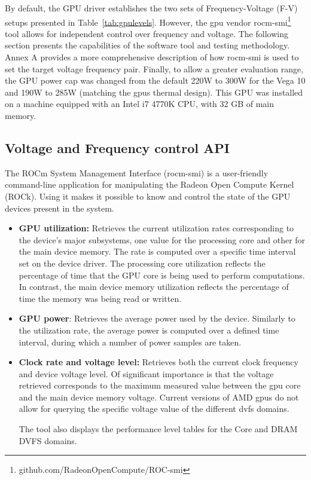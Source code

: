 By default, the GPU driver establishes the two sets of Frequency-Voltage (F-V) setups presented in Table~\ref{tab:gpulevels}. However, the \acrshort{gpu} vendor rocm-smi\footnote{github.com/RadeonOpenCompute/ROC-smi} tool allows for independent control over frequency and voltage. The following section presents the capabilities of the software tool and testing methodology. Annex A provides a more comprehensive description of how rocm-smi is used to set the target voltage frequency pair. Finally, to allow a greater evaluation range, the GPU power cap was changed from the default 220W to 300W for the Vega 10 and 190W to 285W (matching the \acrshort{gpu}s thermal design). This GPU was installed on a machine equipped with an Intel i7 4770K CPU, with 32 GB of main memory. 




\subsection{Voltage and Frequency control API}
The ROCm System Management Interface (rocm-smi) \cite{noauthor_radeonopencompute/roc-smi_2019} is a user-friendly command-line application for manipulating the Radeon Open Compute Kernel (ROCk). Using it makes it possible to know and control the state of the GPU devices present in the system. 

\begin{itemize}
\item \textbf{GPU utilization:} Retrieves the current utilization rates corresponding to the device's major subsystems, one value for the processing core and other for the main device memory. The rate is computed over a specific time interval set on the device driver. The processing core utilization reflects the percentage of time that the GPU core is being used to perform computations. In contrast, the main device memory utilization reflects the percentage of time the memory was being read or written.

\item \textbf{GPU power}: Retrieves the average power used by the device. Similarly to the utilization rate, the average power is computed over a defined time interval, during which a number of power samples are taken.

\item \textbf{Clock rate and voltage level:} Retrieves both the current clock frequency and device voltage level. Of significant importance is that the voltage retrieved corresponds to the maximum measured value between the \acrshort{gpu} core and the main device memory voltage. Current versions of AMD \acrshort{gpu}s do not allow for querying the specific voltage value of the different \acrshort{dvfs} domains.

The tool also displays the performance level tables for the Core and DRAM DVFS domains.
\end{itemize}

